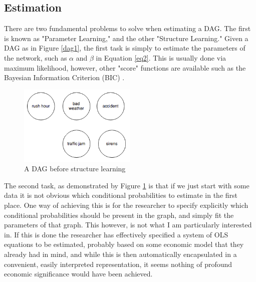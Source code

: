 \documentclass{article}
\begin{document}
\subsection{Estimation}

There are two fundamental problems to solve when estimating a DAG. The first is known as "Parameter Learning," and the other "Structure Learning." Given a DAG as in Figure \ref{dag1}, the first task is simply to estimate the parameters of the network, such as $\alpha$ and $\beta$ in Equation \ref{eq2}. This is usually done via maximum likelihood, however, other "score" functions are available such as the Bayesian Information Criterion (BIC) \cite{chen1998speaker}.

\begin{figure}
\centering
\label{dag2}
\includegraphics[width=0.5\textwidth]{trafficjam_unfit.png}
\caption{A DAG before structure learning}
\end{figure}

The second task, as demonstrated by Figure \ref{dag2} is that if we just start with some data it is not obvious which conditional probabilities to estimate in the first place. One way of achieving this is for the researcher to specify explicitly which conditional probabilities should be present in the graph, and simply fit the parameters of that graph. This however, is not what I am particularly interested in. If this is done the researcher has effectively specified a system of OLS equations to be estimated, probably based on some economic model that they already had in mind, and while this is then automatically encapsulated in a convenient, easily interpreted representation, it seems nothing of profound economic significance would have been achieved. 
\end{document}
